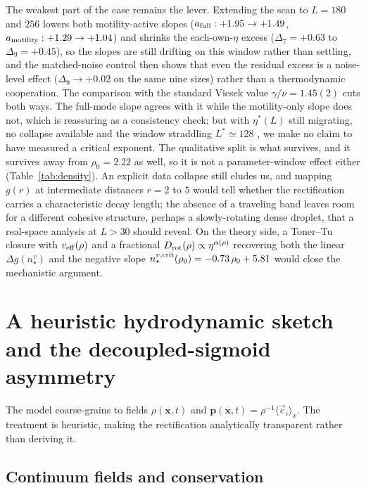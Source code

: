 \documentclass[11pt,a4paper]{article}
\begin{document}
The weakest part of the case remains the lever. Extending the
scan to $L = 180$ and $256$ lowers both motility-active slopes
($a_{\rm full}: +1.95 \to +1.49$, $a_{\rm motility}: +1.29 \to
+1.04$) and shrinks the each-own-$\eta$ excess ($\Delta_7 = +0.63$
to $\Delta_9 = +0.45$), so the slopes are still drifting on this
window rather than settling, and the matched-noise control then
shows that even the residual excess is a noise-level effect
($\Delta_9 \to +0.02$ on the same nine sizes) rather than a
thermodynamic cooperation. The comparison with the standard
Vicsek value $\gamma/\nu = 1.45(2)$ \citep{Baglietto2008,
Baglietto2012} cuts both ways. The full-mode slope agrees with it
while the motility-only slope does not, which is reassuring as a
consistency check; but with $\eta^\ast(L)$ still migrating, no
collapse available and the window straddling $L^\ast \simeq 128$
\citep{Chate2008}, we make no claim to have measured a critical
exponent. The qualitative split is what survives, and it survives
away from $\rho_0 = 2.22$ as well, so it is not a
parameter-window effect either (Table~\ref{tab:density}). An
explicit data collapse still eludes us, and mapping $g(r)$ at
intermediate distances $r = 2$ to $5$ would tell whether the
rectification carries a characteristic decay length; the absence
of a traveling band leaves room for a different cohesive
structure, perhaps a slowly-rotating dense droplet, that a
real-space analysis at $L > 30$ should reveal. On the theory
side, a
Toner--Tu closure with $v_{\rm eff}(\rho)$ and a fractional
$D_{\rm rot}(\rho) \propto \eta^{\alpha(\rho)}$ recovering both
the linear $\Delta g(n_\star^v)$ and the negative slope
$n_\star^{v,{\rm crit}}(\rho_0) = -0.73\,\rho_0 + 5.81$ would
close the mechanistic argument.

\appendix

\section{A heuristic hydrodynamic sketch and the decoupled-sigmoid asymmetry}
\label{sec:hydro}

The model coarse-grains to fields $\rho(\mathbf x, t)$ and
$\mathbf p(\mathbf x, t) = \rho^{-1}\langle\vec e_i\rangle_x$.
The treatment is heuristic, making the rectification
analytically transparent rather than deriving it.

\subsection{Continuum fields and conservation}
\label{sec:hydro_fields}
\end{document}
